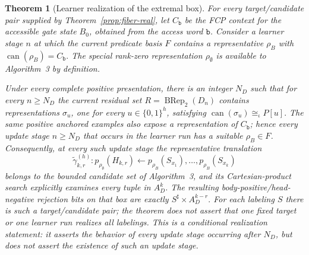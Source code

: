 \documentclass[11pt]{article}
\newtheorem{theorem}{Theorem}[section]
\theoremstyle{definition}
\theoremstyle{remark}
\begin{document}
\begin{theorem}[Learner realization of the extremal box]
\label{thm:alg3-extremal}
For every target/candidate pair supplied by
Theorem~\ref{prop:fiber-real}, let \(C_{\mathtt b}\) be the FCP context for the
accessible gate state \(B_0\), obtained from the access word \(\mathtt b\).
Consider a learner stage \(n\) at which the current predicate basis \(F\)
contains a representative \(\rho_B\) with
\(\operatorname{can}(\rho_B)=C_{\mathtt b}.\)
The special rank-zero representation \(\rho_\emptyset\) is available to
Algorithm~3 by definition.

Under every complete positive presentation, there is an integer \(N_D\) such
that for every \(n\ge N_D\) the current residual set
\(R=\operatorname{BRep}_2(D_n)\)
contains representations \(\sigma_u\), one for every
\(u\in\{0,1\}^h\), satisfying
\(\operatorname{can}(\sigma_u)\cong_\iota P[u].\)
The same positive anchored examples also expose a representation of
\(C_{\mathtt b}\); hence every update stage \(n\ge N_D\) that occurs in the
learner run has a suitable \(\rho_B\in F\).  Consequently, at every such
update stage the representative translation
\[
\widetilde\gamma_{k,r}^{(h)}:
 p_{\rho_\emptyset}(H_{k,r})
 \leftarrow
 p_{\rho_B}(S_{x_1}),\ldots,p_{\rho_B}(S_{x_k})
\]
belongs to the bounded candidate set of Algorithm~3, and its Cartesian-product
search explicitly examines every tuple in \(A_D^k\).  The resulting
body-positive/head-negative rejection bits on that box are exactly
\(S^\sharp\times A_D^{k-r}.\)
For each labeling \(S\) there is such a target/candidate pair; the theorem does
not assert that one fixed target or one learner run realizes all labelings.
This is a conditional realization statement: it asserts the behavior of every
update stage occurring after \(N_D\), but does not assert the existence of such
an update stage.
\end{theorem}
\end{document}

